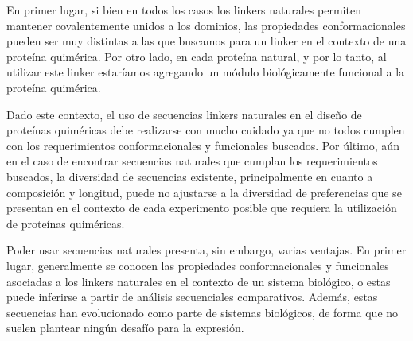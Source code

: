 En primer lugar, si bien en todos los casos los linkers naturales permiten mantener covalentemente unidos a los dominios, 
las propiedades conformacionales pueden ser muy distintas a las que buscamos para un linker en el contexto de una proteína quimérica.
Por otro lado, en cada proteína natural,   y por lo tanto, al utilizar este linker estaríamos agregando un módulo biológicamente funcional a la proteína quimérica.




Dado este contexto, el uso de secuencias linkers naturales en el diseño de proteínas quiméricas debe realizarse con mucho cuidado ya que no todos cumplen con los requerimientos conformacionales y funcionales buscados.
Por último, aún en el caso de encontrar secuencias naturales que cumplan los requerimientos buscados, la diversidad de secuencias existente, principalmente en cuanto a composición y longitud, puede no ajustarse a la diversidad de 
preferencias que se presentan en el contexto de cada experimento posible que requiera la utilización de proteínas quiméricas. %


Poder usar secuencias naturales presenta, sin embargo, varias ventajas. 
En primer lugar, generalmente se conocen las propiedades conformacionales y funcionales asociadas a los linkers naturales en el contexto de un sistema biológico, o estas puede inferirse a partir de análisis secuenciales comparativos. 
Además, estas secuencias han evolucionado como parte de sistemas biológicos, de forma que no suelen plantear ningún desafío para la expresión.









